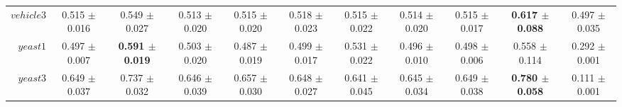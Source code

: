 \begin{table}[!ht]
{\begin{tabular}{r c c c c c c c c c c}
$vehicle3$ & 0.515 $\pm$ 0.016 & 0.549 $\pm$ 0.027 & 0.513 $\pm$ 0.020 & 0.515 $\pm$ 0.020 & 0.518 $\pm$ 0.023 & 0.515 $\pm$ 0.022 & 0.514 $\pm$ 0.020 & 0.515 $\pm$ 0.017 & \textbf{0.617 $\pm$ 0.088} & 0.497 $\pm$ 0.035 \\
$yeast1$ & 0.497 $\pm$ 0.007 & \textbf{0.591 $\pm$ 0.019} & 0.503 $\pm$ 0.020 & 0.487 $\pm$ 0.019 & 0.499 $\pm$ 0.017 & 0.531 $\pm$ 0.022 & 0.496 $\pm$ 0.010 & 0.498 $\pm$ 0.006 & 0.558 $\pm$ 0.114 & 0.292 $\pm$ 0.001 \\
$yeast3$ & 0.649 $\pm$ 0.037 & 0.737 $\pm$ 0.032 & 0.646 $\pm$ 0.039 & 0.657 $\pm$ 0.030 & 0.648 $\pm$ 0.027 & 0.641 $\pm$ 0.045 & 0.645 $\pm$ 0.034 & 0.649 $\pm$ 0.038 & \textbf{0.780 $\pm$ 0.058} & 0.111 $\pm$ 0.001 \\
\end{tabular}}
\end{table}
